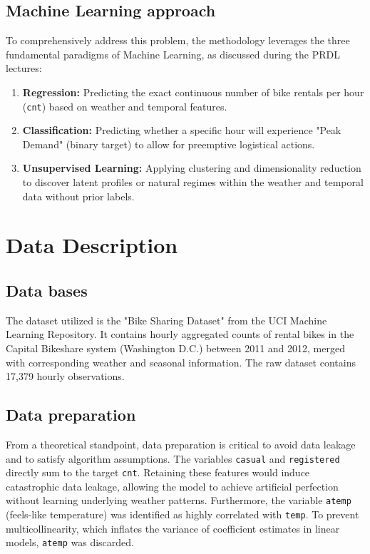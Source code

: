 \documentclass[12pt,a4paper]{article}
\begin{document}
\subsection{Machine Learning approach}
To comprehensively address this problem, the methodology leverages the three fundamental paradigms of Machine Learning, as discussed during the PRDL lectures:
\begin{enumerate}
    \item \textbf{Regression:} Predicting the exact continuous number of bike rentals per hour (\texttt{cnt}) based on weather and temporal features.
    \item \textbf{Classification:} Predicting whether a specific hour will experience "Peak Demand" (binary target) to allow for preemptive logistical actions.
    \item \textbf{Unsupervised Learning:} Applying clustering and dimensionality reduction to discover latent profiles or natural regimes within the weather and temporal data without prior labels.
\end{enumerate}

\section{Data Description}
\subsection{Data bases}
The dataset utilized is the "Bike Sharing Dataset" from the UCI Machine Learning Repository. It contains hourly aggregated counts of rental bikes in the Capital Bikeshare system (Washington D.C.) between 2011 and 2012, merged with corresponding weather and seasonal information. The raw dataset contains 17,379 hourly observations.

\subsection{Data preparation}
From a theoretical standpoint, data preparation is critical to avoid data leakage and to satisfy algorithm assumptions. The variables \texttt{casual} and \texttt{registered} directly sum to the target \texttt{cnt}. Retaining these features would induce catastrophic data leakage, allowing the model to achieve artificial perfection without learning underlying weather patterns. Furthermore, the variable \texttt{atemp} (feels-like temperature) was identified as highly correlated with \texttt{temp}. To prevent multicollinearity, which inflates the variance of coefficient estimates in linear models, \texttt{atemp} was discarded.
\end{document}
